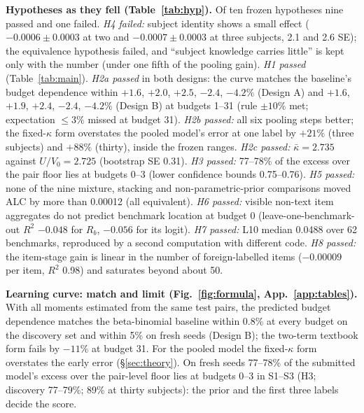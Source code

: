 \documentclass{article}
\begin{document}
\textbf{Hypotheses as they fell (Table~\ref{tab:hyp}).} Of ten frozen hypotheses nine passed and one failed.
\emph{H4 failed:} subject identity shows a small effect (\mbox{$-0.0006 \pm 0.0003$} at two and \mbox{$-0.0007 \pm 0.0003$} at three subjects, 2.1 and 2.6 SE); the equivalence hypothesis failed, and ``subject knowledge carries little'' is kept only
with the number (under one fifth of the pooling gain). \emph{H1 passed} (Table~\ref{tab:main}). \emph{H2a passed} in both designs: the curve matches the baseline's budget dependence within $+1.6$, $+2.0$,
$+2.5$, $-2.4$, $-4.2\%$ (Design A) and $+1.6$, $+1.9$, $+2.4$, $-2.4$, $-4.2\%$ (Design B) at budgets 1--31 (rule
$\pm 10\%$ met; expectation $\le 3\%$ missed at budget 31). \emph{H2b passed:} all six pooling steps better; the
fixed-$\kappa$ form overstates the pooled model's error at one label by $+21\%$ (three subjects) and $+88\%$ (thirty),
inside the frozen ranges. \emph{H2c passed:} $\bar\kappa = 2.735$ against $U/V_0 = 2.725$ (bootstrap SE 0.31). \emph{H3
passed:} 77--78\% of the excess over the pair floor lies at budgets 0--3 (lower confidence bounds 0.75--0.76).
\emph{H5 passed:} none of the nine mixture, stacking and non-parametric-prior comparisons moved ALC by more than 0.00012
(all equivalent). \emph{H6 passed:} visible non-text item aggregates do not predict benchmark location at budget 0
(leave-one-benchmark-out $R^2$ $-0.048$ for $R_b$, $-0.056$ for its logit). \emph{H7 passed:} L10 median 0.0488 over 62
benchmarks, reproduced by a second computation with different code. \emph{H8 passed:} the item-stage gain is linear in
the number of foreign-labelled items ($-0.00009$ per item, $R^2$ 0.98) and saturates beyond about 50.

\textbf{Learning curve: match and limit (Fig.~\ref{fig:formula}, App.~\ref{app:tables}).} With all moments estimated from the same test
pairs, the predicted budget dependence matches the beta-binomial baseline within 0.8\% at every budget on the discovery
set and within 5\% on fresh seeds (Design B); the two-term textbook form fails by $-11\%$ at budget 31. For the pooled
model the fixed-$\kappa$ form overstates the early error (\S\ref{sec:theory}). On fresh seeds 77--78\% of the submitted model's excess over the pair-level floor lies at
budgets 0--3 in S1--S3 (H3; discovery 77--79\%; 89\% at thirty subjects): the prior and the first three labels decide the score.


\end{document}
